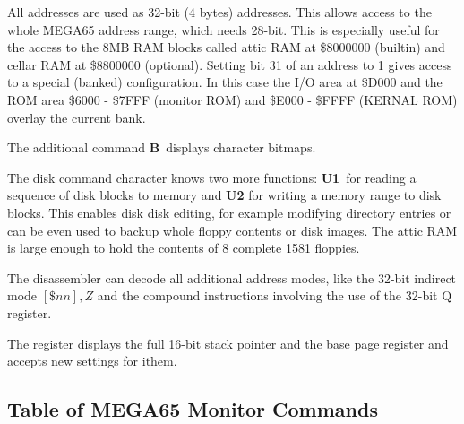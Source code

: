 \begin{description}[leftmargin=1cm,style=nextline]
\item[Addresses:] All addresses are used as 32-bit (4 bytes) addresses.
   This allows access to the whole MEGA65 address range, which needs
   28-bit. This is especially useful for the access to the 8MB RAM blocks
   called attic RAM at \$8000000 (builtin) and cellar RAM at
   \$8800000 (optional). Setting bit 31 of an address to 1 gives access
   to a special (banked) configuration. In this case the I/O area at \$D000
   and the ROM area \$6000 - \$7FFF (monitor ROM) and \$E000 - \$FFFF
   (KERNAL ROM) overlay the current bank.

\item[Commands:] The additional command {\bf B} displays character bitmaps.

\item[Disk access:] The disk command character {\bf \@} knows two more
  functions: {\bf U1} for reading a sequence of disk blocks to memory and
  {\bf U2} for writing a memory range to disk blocks. This enables disk
  disk editing, for example modifying directory entries or can be even
  used to backup whole floppy contents or disk images. The attic RAM is
  large enough to hold the contents of 8 complete 1581 floppies.

\item[Disassembler:] The disassembler can decode all additional
  address modes, like the 32-bit indirect mode $[\$nn],Z$
  and the compound instructions involving the use of the 32-bit Q register.

\item[Register:] The register displays the full 16-bit stack pointer
 and the base page register and accepts new settings for ithem.

\end{description}



\subsection{Table of MEGA65 Monitor Commands}

